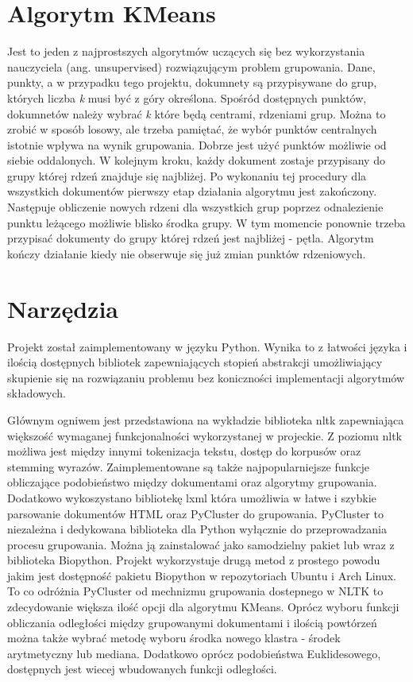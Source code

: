 \documentclass{article}
\begin{document}
\section{Algorytm KMeans}
Jest to jeden z najprostszych algorytmów uczących się bez wykorzystania nauczyciela (ang. unsupervised) rozwiązującym problem grupowania. Dane, punkty, a w przypadku tego projektu, dokumnety są przypisywane do grup, których liczba \emph{k} musi być z góry określona. Spośród dostępnych punktów, dokumnetów należy wybrać \emph{k} które będą centrami, rdzeniami grup. Można to zrobić w sposób losowy, ale trzeba pamiętać, że wybór punktów centralnych istotnie wpływa na wynik grupowania. Dobrze jest użyć punktów możliwie od siebie oddalonych. W kolejnym kroku, każdy dokument zostaje przypisany do grupy której rdzeń znajduje się najbliżej. Po wykonaniu tej procedury dla wszystkich dokumentów pierwszy etap działania algorytmu jest zakończony. Następuje obliczenie nowych rdzeni dla wszystkich grup poprzez odnalezienie punktu leżącego możliwie blisko środka grupy. W tym momencie ponownie trzeba przypisać dokumenty do grupy której rdzeń jest najbliżej - pętla. Algorytm kończy działanie kiedy nie obserwuje się już zmian punktów rdzeniowych.

\section{Narzędzia}
Projekt został zaimplementowany w języku Python. Wynika to z łatwości języka i ilością dostępnych bibliotek zapewniających stopień abstrakcji umożliwiający skupienie się na rozwiązaniu problemu bez koniczności implementacji algorytmów składowych.

Głównym ogniwem jest przedstawiona na wykładzie biblioteka nltk zapewniająca większość wymaganej funkcjonalności wykorzystanej w projeckie. Z poziomu nltk możliwa jest między innymi tokenizacja tekstu, dostęp do korpusów oraz stemming wyrazów. Zaimplementowane są także najpopularniejsze funkcje obliczające podobieństwo między dokumentami oraz algorytmy grupowania. Dodatkowo wykoszystano bibliotekę lxml która umożliwia w łatwe i szybkie parsowanie dokumentów HTML oraz PyCluster do grupowania.
PyCluster to niezależna i dedykowana biblioteka dla Python wyłącznie do przeprowadzania procesu grupowania. Można ją zainstalować jako samodzielny pakiet lub wraz z biblioteka Biopython. Projekt wykorzystuje drugą metod z prostego powodu jakim jest dostępność pakietu Biopython w repozytoriach Ubuntu i Arch Linux.
To co odróżnia PyCluster od mechnizmu grupowania dostepnego w NLTK to zdecydowanie większa ilość opcji dla algorytmu KMeans. Oprócz wyboru funkcji obliczania odległości między grupowanymi dokumentami i ilością powtórzeń można także wybrać metodę wyboru środka nowego klastra - środek arytmetyczny lub mediana. Dodatkowo oprócz podobieństwa Euklidesowego, dostępnych jest wiecej wbudowanych funkcji odległości.
\end{document}
